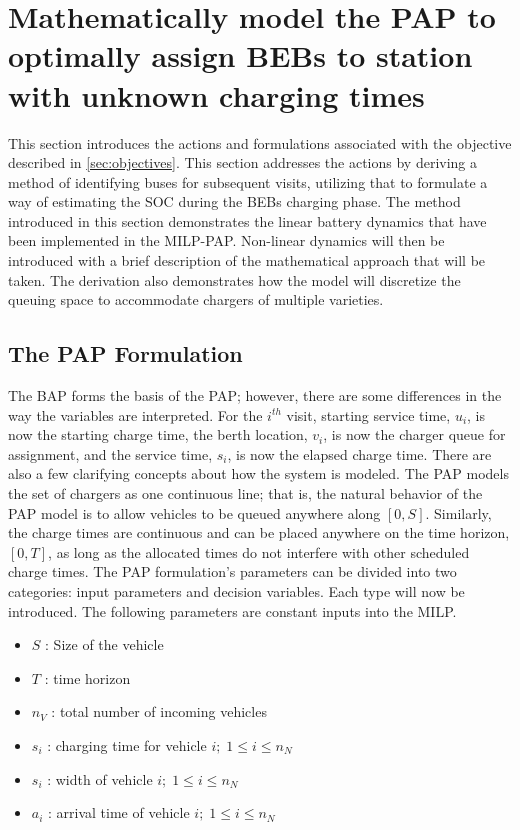 \documentclass[ee,msthesis]{usuthesis}
\begin{document}
\section{Mathematically model the PAP to optimally assign BEBs to station with unknown charging times}
\label{sec:math-model-pap}
This section introduces the actions and formulations associated with the objective described in \ref{sec:objectives}. This
section addresses the actions by deriving a method of identifying buses for subsequent visits, utilizing that to
formulate a way of estimating the SOC during the BEBs charging phase. The method introduced in this section demonstrates
the linear battery dynamics that have been implemented in the MILP-PAP. Non-linear dynamics will then be introduced with
a brief description of the mathematical approach that will be taken. The derivation also demonstrates how the model will
discretize the queuing space to accommodate chargers of multiple varieties.

\subsection{The PAP Formulation}
\label{sec:input-variables}
The BAP forms the basis of the PAP; however, there are some differences in the way the variables are interpreted. For the
\(i^{th}\) visit, starting service time, \(u_i\), is now the starting charge time, the berth location, \(v_i\), is now the
charger queue for assignment, and the service time, \(s_i\), is now the elapsed charge time. There are also a few clarifying concepts
about how the system is modeled. The PAP models the set of chargers as one continuous line; that is, the natural
behavior of the PAP model is to allow vehicles to be queued anywhere along \([0,S]\). Similarly, the charge times are
continuous and can be placed anywhere on the time horizon, \([0,T]\), as long as the allocated times do not interfere with
other scheduled charge times. The PAP formulation's parameters can be divided into two categories: input parameters and
decision variables. Each type will now be introduced. The following parameters are constant inputs into the MILP.

\begin{itemize}
	\item $S$   : Size of the vehicle
	\item $T$   : time horizon
	\item $n_V$ : total number of incoming vehicles
	\item $s_i$ : charging time for vehicle $i;\; 1 \leq i \leq n_N$
	\item $s_i$ : width of vehicle $i;\; 1 \leq i \leq n_N$
	\item $a_i$ : arrival time of vehicle $i;\; 1 \leq i \leq n_N$
\end{itemize}
\end{document}
